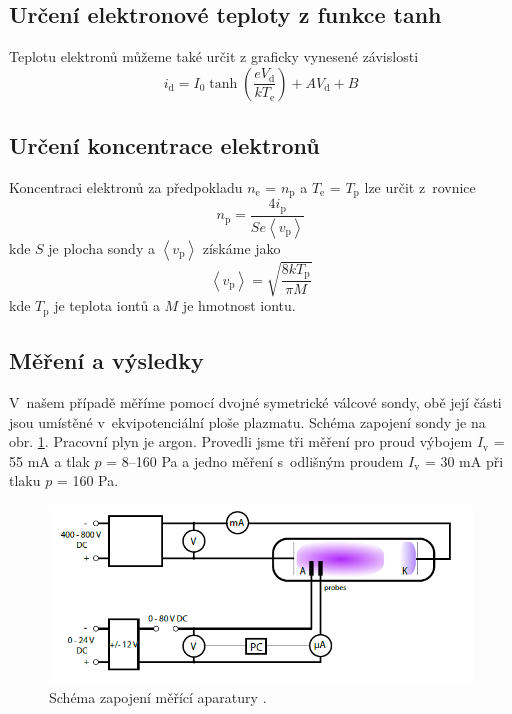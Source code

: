 \documentclass[a4paper,12pt]{article}
\begin{document}
\subsection{Určení elektronové teploty z funkce tanh}
Teplotu elektronů můžeme také určit z graficky
vynesené závislosti
\begin{equation}
	i_\text{{d}} = I_0 \tanh\left( \frac{e V_\text{{d}} }{k T_\text{e}} \right) 
	+ A V_\text{{d}} + B 
	\label{tanh}
\end{equation}

\subsection{Určení koncentrace elektronů}
Koncentraci elektronů za předpokladu $n_\text{{e}}$ = $n_\text{{p}}$
a $T_\text{{e}}$ = $T_\text{{p}}$
lze určit z~rovnice
\begin{equation}
	n_\text{{p}} = \frac{4  i_\text{{p}}}{S e \left\langle v_\text{{p}} 
	\right\rangle }
	\label{ne}
\end{equation}
kde $S$ je plocha sondy a $\left\langle  v_\text{{p}} \right\rangle$ získáme jako
\begin{equation}
	\left\langle v_\text{{p}} \right\rangle = \sqrt{\frac{8 
	kT_\text{{p}}}{\pi 
	M}  }
	\label{vp}
\end{equation}
kde $T_\text{p}$ je teplota iontů a $M$ je hmotnost iontu.

\subsection{Měření a výsledky}
V~našem případě měříme pomocí dvojné symetrické válcové sondy,
obě její části jsou umístěné v~ekvipotenciální ploše plazmatu.
Schéma zapojení sondy je na obr. \ref{zapojenidvojna}. Pracovní
plyn je argon. Provedli jsme tři měření pro proud výbojem  $I_\text{{v}}$ =
55 \si{\milli\ampere} a tlak $p$ = 8--160 \si{\pascal} a jedno
měření s~odlišným proudem $I_\text{{v}}$ =
30 \si{\milli\ampere} při tlaku $p$ = 160 \si{\pascal}.

\begin{figure}[h]
	\centering
	\includegraphics[width=130mm]{zapojenidvojna.png}
	\caption{Schéma zapojení měřící aparatury \cite{navod}.}
	\label{zapojenidvojna}
\end{figure}
\end{document}
